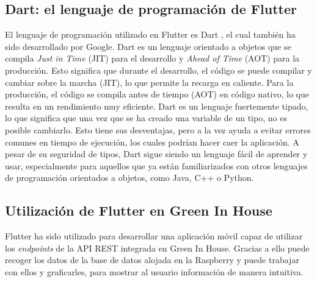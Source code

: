     \subsection{Dart: el lenguaje de programación de Flutter}
    El lenguaje de programación utilizado en Flutter es Dart \cite{wiki:dart} , el cual también ha sido desarrollado por Google. Dart es un lenguaje orientado a objetos que se compila \textit{Just in Time} (JIT) para el desarrollo y \textit{Ahead of Time} (AOT) para la producción. Esto significa que durante el desarrollo, el código se puede compilar y cambiar sobre la marcha (JIT), lo que permite la recarga en caliente. Para la producción, el código se compila antes de tiempo (AOT) en código nativo, lo que resulta en un rendimiento muy eficiente.
    Dart es un lenguaje fuertemente tipado, lo que significa que una vez que se ha creado una variable de un tipo, no es posible cambiarlo. Esto tiene sus desventajas, pero a la vez ayuda a evitar errores comunes en tiempo de ejecución, los cuales podrían hacer caer la aplicación. A pesar de su seguridad de tipos, Dart sigue siendo un lenguaje fácil de aprender y usar, especialmente para aquellos que ya están familiarizados con otros lenguajes de programación orientados a objetos, como Java, C++ o Python.
    \subsection{Utilización de Flutter en Green In House}
    Flutter ha sido utilizado para desarrollar una aplicación móvil capaz de utilizar los \textit{endpoints} de la API REST integrada en Green In House. Gracias a ello puede recoger los datos de la base de datos alojada en la Raspberry y puede trabajar con ellos y graficarles, para mostrar al usuario información de manera intuitiva.

